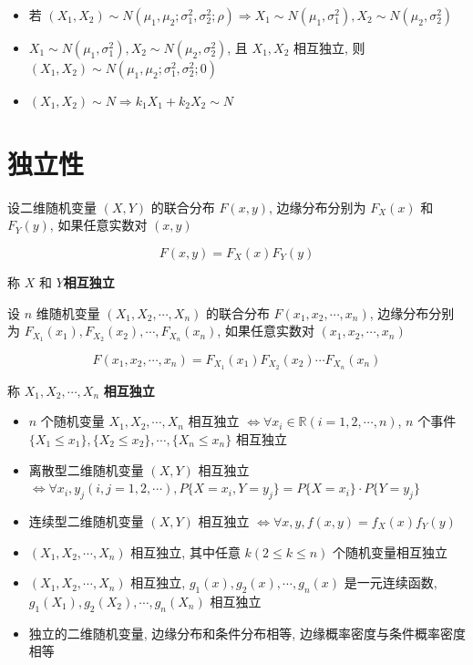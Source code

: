 \begin{corollary}[二维正态分布性质]
	\begin{itemize}
		\item 若 $(X_{1},X_{2}) \sim N(\mu_{1},\mu_{2};\sigma_{1}^{2},\sigma_{2}^{2};\rho)\Rightarrow X_{1}\sim N(\mu_{1},\sigma_{1}^{2}), X_{2}\sim N(\mu_{2},\sigma_{2}^{2})$  
		\item $X_{1}\sim N(\mu_{1},\sigma_{1}^{2}), X_{2}\sim N(\mu_{2},\sigma_{2}^{2})$, 且 $X_{1}, X_{2}$ 相互独立, 则 $(X_{1},X_{2})\sim N(\mu_{1},\mu_{2};\sigma_{1}^{2},\sigma_{2}^{2};0)$
		\item $(X_{1},X_{2})\sim N\Rightarrow k_{1}X_{1} + k_{2}X_{2}\sim N$
	\end{itemize}
\end{corollary}

\section{独立性}
\begin{definition}[二维随机变量独立性]
	设二维随机变量 $(X,Y)$ 的联合分布 $F(x,y)$, 边缘分布分别为 $F_{X}(x)$ 和 $F_{Y}(y)$, 如果任意实数对 $(x,y)$ 
	
	$$F(x,y) = F_{X}(x)F_{Y}(y)$$
	
	称 $X$ 和 $Y$\textbf{相互独立}
\end{definition}
\begin{definition}[$n$ 维随机变量独立性]
	设 $n$ 维随机变量 $(X_{1},X_{2},\cdots,X_{n})$ 的联合分布 $F(x_{1},x_{2},\cdots,x_{n})$, 
	边缘分布分别为 $F_{X_{1}}(x_{1}),F_{X_{2}}(x_{2}),\cdots,F_{X_{n}}(x_{n})$, 如果任意实数对 $(x_{1},x_{2},\cdots,x_{n})$
	
	$$F(x_{1},x_{2},\cdots,x_{n}) = F_{X_{1}}(x_{1})F_{X_{2}}(x_{2})\cdots F_{X_{n}}(x_{n})$$
	
	称 $X_{1},X_{2},\cdots,X_{n}$ \textbf{相互独立}
\end{definition}

\begin{corollary}[独立性性质]
	\begin{itemize}
		\item $n$ 个随机变量 $X_{1}, X_{2}, \cdots, X_{n}$ 相互独立 $\Leftrightarrow \forall x_{i}\in \mathbb{R} (i = 1,2,\cdots,n)$, 
		$n$ 个事件 $\{X_{1}\leq x_{1}\}, \{X_{2}\leq x_{2}\},\cdots,\{X_{n}\leq x_{n}\}$ 相互独立 
		\item 离散型二维随机变量 $(X,Y)$ 相互独立 $\Leftrightarrow \forall x_{i},y_{j} (i,j = 1,2,\cdots), P\{X = x_{i},Y = y_{j}\} = P\{X = x_{i}\} \cdot P\{Y = y_{j}\}$
		\item 连续型二维随机变量 $(X,Y)$ 相互独立 $\Leftrightarrow \forall x,y, f(x,y) = f_{X}(x)f_{Y}(y)$
		\item $(X_{1}, X_{2}, \cdots, X_{n})$ 相互独立, 其中任意 $k(2\leq k\leq n)$ 个随机变量相互独立
		\item $(X_{1}, X_{2}, \cdots, X_{n})$ 相互独立, $g_{1}(x), g_{2}(x), \cdots, g_{n}(x)$ 是一元连续函数, $g_{1}(X_{1}), g_{2}(X_{2}),\cdots,g_{n}(X_{n})$ 相互独立
		\item 独立的二维随机变量, 边缘分布和条件分布相等, 边缘概率密度与条件概率密度相等
	\end{itemize}
\end{corollary}


